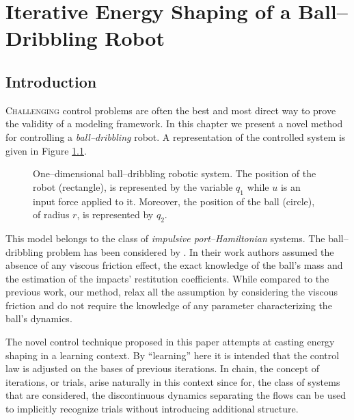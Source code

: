 %
\chapter{Iterative Energy Shaping of a Ball--Dribbling Robot}

\label{chap:multistable}
\minitoc

\thispagestyle{empty}

\newpage
\section{Introduction}
%
\lettrine[lines=4]{\color{brickred}C}{hallenging} control problems are often the best and most direct way to prove the validity of a modeling framework. In this chapter we present a novel method for controlling a \textit{ball--dribbling} robot.
A representation of the controlled system is given in Figure \ref{fig:1D}.
%
\begin{figure}[h]
	\centering
	
	\caption{One--dimensional ball--dribbling robotic system. The position of the robot (rectangle), is represented by the variable $q_1$ while $u$ is an input force applied to it. Moreover, the position of the ball (circle), of radius $r$, is represented by $q_2$. }
	\label{fig:1D}
\end{figure}
%

This model belongs to the class of \textit{impulsive port--Hamiltonian} systems. The ball--dribbling problem has been considered by \cite{Batz2010}. In their work authors assumed the absence of any viscous friction effect, the exact knowledge of the ball's mass and the estimation of the impacts' restitution coefficients. While compared to the previous work, our method, relax all the assumption by considering the viscous friction and do not require the knowledge of any parameter characterizing the ball's dynamics.

The novel control technique proposed in this paper attempts at casting energy shaping in a learning context. By ``learning'' here it is intended that the control law is adjusted on the bases of previous iterations. In chain, the concept of iterations, or trials, arise naturally in this context since for, the class of systems that are considered, the discontinuous dynamics separating the flows can be used to implicitly recognize trials without introducing additional structure.

